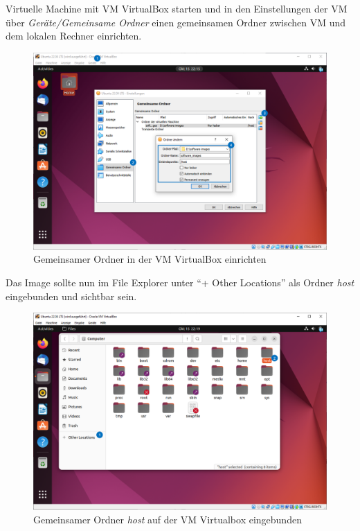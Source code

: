 \documentclass[
  11pt,
  a4paper,
  oneside, openany  ,captions=tableheading
]{scrbook}
\theoremstyle{remark}
\begin{document}
Virtuelle Machine mit VM VirtualBox starten und in den Einstellungen der
VM über \emph{Geräte/Gemeinsame Ordner} einen gemeinsamen Ordner
zwischen VM und dem lokalen Rechner einrichten.

\begin{figure}[H]

{\centering \includegraphics{images/raspberrypi_image_verkleinern_02.png}

}

\caption{Gemeinsamer Ordner in der VM VirtualBox einrichten}

\end{figure}%

Das Image sollte nun im File Explorer unter ``+ Other Locations'' als
Ordner \emph{host} eingebunden und sichtbar sein.

\begin{figure}[H]

{\centering \includegraphics{images/raspberrypi_image_verkleinern_03.png}

}

\caption{Gemeinsamer Ordner \emph{host} auf der VM Virtualbox
eingebunden}

\end{figure}%
\end{document}
